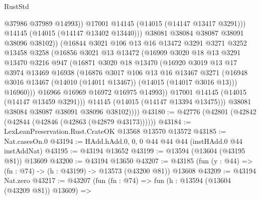 \begin{lexlean}{RustStd}
\begin{coremodule}
                          @37986
                          @37989
                          @14993))
                      @17001
                      @14145
                      (@14015 (@14147 @13417 @3291)))
                    @14145
                    (@14015 (@14147 @13402 @13440)))
                  @38081
                  @38084
                  @38087
                  @38091
                  @38096
                  @38102))
              (@16844
                @3021
                @106
                @13
                @16
                @13472
                @3291
                @3271
                @3252
                @13458
                @3258
                (@16856
                  @3021
                  @13
                  @13472
                  (@16909
                    @3020
                    @18
                    @13
                    @3291
                    @13470
                    @3216
                    @947
                    (@16871
                      @3020
                      @18
                      @13470
                      (@16920
                        @3019
                        @13
                        @17
                        @3974
                        @13469
                        @16938
                        (@16876
                          @3017
                          @106
                          @13
                          @16
                          @13467
                          @3271
                          (@16948 @3016 @13467 (@14010 (@14011 @13467)) (@14015 (@14017 @3016 @13)))
                          @16960)))
                    @16966
                    @16969
                    @16972
                    @16975
                    @14993))
                @17001
                @14145
                (@14015 (@14147 @13459 @3291)))
              @14145
              (@14015 (@14147 @13394 @13475)))
            @38081
            @38084
            @38087
            @38091
            @38096
            @38102))))
@43180 := @42776 (@42801 (@42842 (@42844 (@42846 (@42863 (@42879 @43173))))))
@43184 := LexLeanPreservation.Rust.CrateOK @13568 @13570 @13572
@43185 := Nat.casesOn.{0}
@43194 := HAdd.hAdd.{0, 0, 0} @44 @44 @44 (instHAdd.{0} @44 instAddNat)
@43195 := @43194 @13652
@43199 := @13594 (@13604 (@43195 @81)) @13609
@43200 := @43194 @13650
@43207 := @43185 (fun (y : @44) => (fn : @74) -> (h : @43199) -> @13573 (@43200 @81)) @13608
@43209 := @43194 Nat.zero
@43217 := @43207
    (fun (fn : @74) =>
    fun (h : @13594 (@13604 (@43209 @81)) @13609) =>

\end{coremodule}
\end{lexlean}
